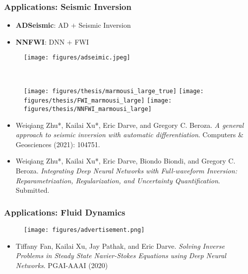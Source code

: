 \documentclass[usenames,dvipsnames]{beamer}
\begin{document}
\begin{frame}
	\frametitle{Applications: Seismic Inversion}
	\begin{itemize}
		\item \textbf{ADSeismic}: AD $+$ Seismic Inversion
		\item \textbf{NNFWI}: DNN $+$ FWI
	\end{itemize}

\begin{minipage}[t]{0.7\textwidth}
		\begin{figure}[hbt]
		\centering
		\texttt{[image: figures/adseimic.jpeg]}
	\end{figure}
\end{minipage}~
\begin{minipage}[t]{0.3\textwidth}
	\begin{figure}[hbt]
		\texttt{[image: figures/thesis/marmousi\_large\_true]}
				\texttt{[image: figures/thesis/FWI\_marmousi\_large]}
						\texttt{[image: figures/thesis/NNFWI\_marmousi\_large]}
	\end{figure}
\end{minipage}

		
	\vspace{-0.2cm}
	{
		\tiny
		
		\begin{itemize}
			\item[] Weiqiang Zhu*, Kailai Xu*, Eric Darve, and Gregory C. Beroza. \textit{A general approach to seismic inversion with automatic differentiation}. Computers \& Geosciences (2021): 104751.
			\item[] Weiqiang Zhu*, Kailai Xu*, Eric Darve, Biondo Biondi, and Gregory C. Beroza. \textit{Integrating Deep Neural Networks with Full-waveform Inversion: Reparametrization, Regularization, and Uncertainty Quantification}. Submitted.
		\end{itemize}
		
		
		
	}
\end{frame}

\begin{frame}
	\frametitle{Applications: Fluid Dynamics}
	
	\begin{figure}[hbt]
		\centering 
		\texttt{[image: figures/advertisement.png]}
	\end{figure}

	\vspace{-0.2cm}
{
	\tiny
	
	\begin{itemize}
		\item[] Tiffany Fan, Kailai Xu, Jay Pathak, and Eric Darve. \textit{Solving Inverse Problems in Steady State Navier-Stokes Equations using Deep Neural Networks}. PGAI-AAAI (2020)
	\end{itemize}
}

\end{frame}
\end{document}
